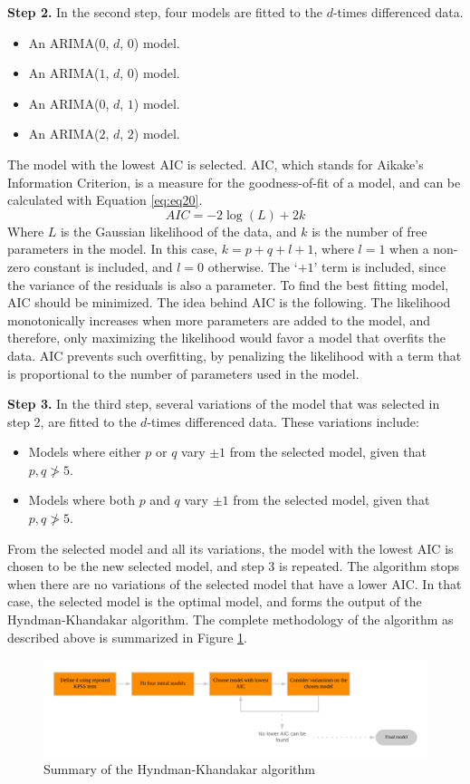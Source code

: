 \documentclass[12pt,oneside]{reedthesis}
\providecommand{\tightlist}{%
  \setlength{\itemsep}{0pt}\setlength{\parskip}{0pt}}
\begin{document}
\textbf{Step 2.} In the second step, four models are fitted to the
\(d\)-times differenced data.
\begin{itemize}
\tightlist
\item
  An ARIMA(\(0\), \(d\), \(0\)) model.
\item
  An ARIMA(\(1\), \(d\), \(0\)) model.
\item
  An ARIMA(\(0\), \(d\), \(1\)) model.
\item
  An ARIMA(\(2\), \(d\), \(2\)) model.
\end{itemize}
The model with the lowest AIC is selected. AIC, which stands for
Aikake's Information Criterion, is a measure for the goodness-of-fit of
a model, and can be calculated with Equation \eqref{eq:eq20}.
\begin{equation}
AIC = -2 \log(L) + 2k
\label{eq:eq20}
\end{equation}
Where \(L\) is the Gaussian likelihood of the data, and \(k\) is the
number of free parameters in the model. In this case,
\(k = p + q + l + 1\), where \(l = 1\) when a non-zero constant is
included, and \(l = 0\) otherwise. The `\(+1\)' term is included, since
the variance of the residuals is also a parameter. To find the best
fitting model, AIC should be minimized. The idea behind AIC is the
following. The likelihood monotonically increases when more parameters
are added to the model, and therefore, only maximizing the likelihood
would favor a model that overfits the data. AIC prevents such
overfitting, by penalizing the likelihood with a term that is
proportional to the number of parameters used in the model.

\textbf{Step 3.} In the third step, several variations of the model that
was selected in step 2, are fitted to the \(d\)-times differenced data.
These variations include:
\begin{itemize}
\tightlist
\item
  Models where either \(p\) or \(q\) vary \(\pm 1\) from the selected
  model, given that \(p, q \ngtr 5\).
\item
  Models where both \(p\) and \(q\) vary \(\pm 1\) from the selected
  model, given that \(p, q \ngtr 5\).
\end{itemize}
From the selected model and all its variations, the model with the
lowest AIC is chosen to be the new selected model, and step 3 is
repeated. The algorithm stops when there are no variations of the
selected model that have a lower AIC. In that case, the selected model
is the optimal model, and forms the output of the Hyndman-Khandakar
algorithm. The complete methodology of the algorithm as described above
is summarized in Figure \ref{fig:hyndman}.
\begin{figure}[h]
\includegraphics[width=\textwidth]{Figures/hyndman} \caption{Summary of the Hyndman-Khandakar algorithm}\label{fig:hyndman}
\end{figure}
\end{document}
